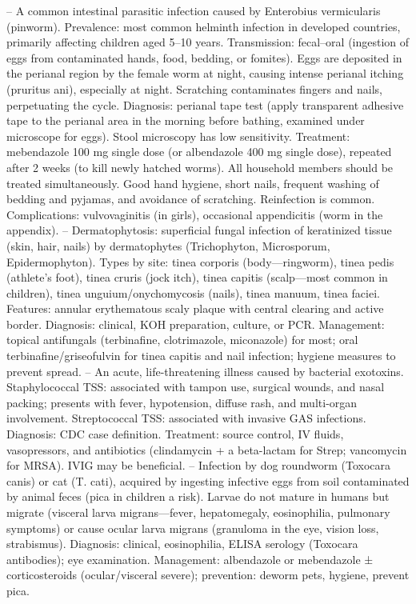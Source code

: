 -- A common intestinal parasitic infection caused by Enterobius vermicularis (pinworm). Prevalence: most common helminth infection in developed countries, primarily affecting children aged 5--10 years. Transmission: fecal–oral (ingestion of eggs from contaminated hands, food, bedding, or fomites). Eggs are deposited in the perianal region by the female worm at night, causing intense perianal itching (pruritus ani), especially at night. Scratching contaminates fingers and nails, perpetuating the cycle. Diagnosis: perianal tape test (apply transparent adhesive tape to the perianal area in the morning before bathing, examined under microscope for eggs). Stool microscopy has low sensitivity. Treatment: mebendazole 100 mg single dose (or albendazole 400 mg single dose), repeated after 2 weeks (to kill newly hatched worms). All household members should be treated simultaneously. Good hand hygiene, short nails, frequent washing of bedding and pyjamas, and avoidance of scratching. Reinfection is common. Complications: vulvovaginitis (in girls), occasional appendicitis (worm in the appendix).
-- Dermatophytosis: superficial fungal infection of keratinized tissue (skin, hair, nails) by dermatophytes (Trichophyton, Microsporum, Epidermophyton). Types by site: tinea corporis (body—ringworm), tinea pedis (athlete's foot), tinea cruris (jock itch), tinea capitis (scalp—most common in children), tinea unguium/onychomycosis (nails), tinea manuum, tinea faciei. Features: annular erythematous scaly plaque with central clearing and active border. Diagnosis: clinical, KOH preparation, culture, or PCR. Management: topical antifungals (terbinafine, clotrimazole, miconazole) for most; oral terbinafine/griseofulvin for tinea capitis and nail infection; hygiene measures to prevent spread.
-- An acute, life-threatening illness caused by bacterial exotoxins. Staphylococcal TSS: associated with tampon use, surgical wounds, and nasal packing; presents with fever, hypotension, diffuse rash, and multi-organ involvement. Streptococcal TSS: associated with invasive GAS infections. Diagnosis: CDC case definition. Treatment: source control, IV fluids, vasopressors, and antibiotics (clindamycin + a beta-lactam for Strep; vancomycin for MRSA). IVIG may be beneficial.
-- Infection by dog roundworm (Toxocara canis) or cat (T. cati), acquired by ingesting infective eggs from soil contaminated by animal feces (pica in children a risk). Larvae do not mature in humans but migrate (visceral larva migrans—fever, hepatomegaly, eosinophilia, pulmonary symptoms) or cause ocular larva migrans (granuloma in the eye, vision loss, strabismus). Diagnosis: clinical, eosinophilia, ELISA serology (Toxocara antibodies); eye examination. Management: albendazole or mebendazole ± corticosteroids (ocular/visceral severe); prevention: deworm pets, hygiene, prevent pica.
